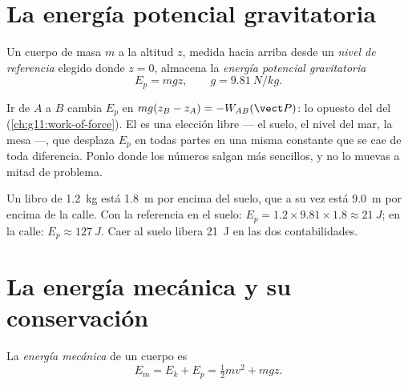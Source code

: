 \section{La energía potencial gravitatoria}

\begin{definition}\label{def:g11:mechanical-energy:potential}
Un cuerpo de masa $m$ a la altitud $z$, medida hacia arriba desde un
\emph{nivel de referencia} elegido donde
$z = 0$, almacena la \emph{energía potencial
gravitatoria}
\[
E_p = m g z, \qquad g = \qty{9.81}{N/kg}.
\]
\end{definition}

\begin{remark}\label{rem:g11:mechanical-energy:reference}
Ir de $A$ a $B$ cambia $E_p$ en
$mg(z_B - z_A) = -W_{AB}(\vect P)$: lo opuesto del  del 
(\cref{ch:g11:work-of-force}). El  es una elección
libre --- el suelo, el nivel del mar, la mesa ---, que desplaza $E_p$
en todas partes en una misma constante que se cae de toda diferencia.
Ponlo donde los números salgan más sencillos, y no lo muevas a mitad de
problema.
\end{remark}

\begin{example}\label{ex:g11:mechanical-energy:shelf}
Un libro de \qty{1.2}{kg} está \qty{1.8}{m} por encima del suelo, que a
su vez está \qty{9.0}{m} por encima de la calle. Con la referencia en el
suelo: $E_p = 1.2 \times 9.81 \times 1.8 \approx \qty{21}{J}$; en la
calle: $E_p \approx \qty{127}{J}$. Caer al suelo libera \qty{21}{J} en
las dos contabilidades.
\end{example}

\section{La energía mecánica y su conservación}

\begin{definition}\label{def:g11:mechanical-energy:em}
La \emph{energía mecánica} de un cuerpo es
\[
E_m = E_k + E_p = \tfrac12 m v^2 + m g z .
\]
\end{definition}

